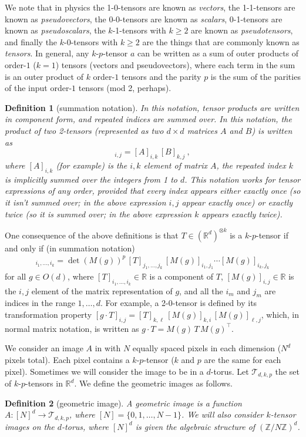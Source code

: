 \documentclass{article}
\theoremstyle{plain}
\newtheorem{definition}{Definition}
\begin{document}
We note that in physics the 1-0-tensors are known as \emph{vectors}, the 1-1-tensors are known as \emph{pseudovectors}, the 0-0-tensors are known as \emph{scalars}, 0-1-tensors are known as \emph{pseudoscalars}, the $k$-1-tensors with $k\geq 2$ are known as \emph{pseudotensors}, and finally the $k$-0-tensors with $k\geq 2$ are the things that are commonly known as \emph{tensors}.
In general, any $k$-$p$-tensor $a$ can be written as a sum of outer products of order-$1$ ($k=1$) tensors (vectors and pseudovectors), where each term in the sum is an outer product of $k$ order-$1$ tensors and the parity $p$ is the sum of the parities of the input order-$1$ tensors (mod 2, perhaps).

\begin{definition}[summation notation]
In this notation, tensor products are written in component form, and repeated indices are summed over.
In this notation, the product of two 2-tensors (represented as two $d\times d$ matrices $A$ and $B$) is written as
\begin{equation}
    [A\, B]_{i,j} = [A]_{i,k}\,[B]_{k,j} ~,
\end{equation}
where $[A]_{i,k}$ (for example) is the $i,k$ element of matrix $A$, the repeated index $k$ is implicitly summed over the integers from 1 to $d$.
This notation works for tensor expressions of any order, provided that every index appears either exactly once (so it isn't summed over; in the above expression $i, j$ appear exactly once) or exactly twice (so it is summed over; in the above expression $k$ appears exactly twice). 
\end{definition}

One consequence of the above definitions is that 
$T\in (\mathbb R^d)^{\otimes k}$ is a $k$-$p$-tensor if and only if (in summation notation)
\begin{align}
    [g\cdot T]_{i_1,\ldots, i_k} = \det(M(g))^p\, [T]_{j_1,\ldots,j_k}\,[M(g)]_{i_1,j_1}\cdots[M(g)]_{i_k,j_k}
\end{align} for all $g\in O(d)$, where $[T]_{i_1, \ldots ,i_k} \in \mathbb R$ is a component of $T$, $[M(g)]_{i,j}\in\mathbb R$ is the $i,j$ element of the matrix representation of $g$, and all the $i_m$ and $j_m$ are indices in the range $1,\ldots,d$.
For example, a 2-0-tensor is defined by its transformation property
$[g\cdot T]_{i,j} = [T]_{k,\ell}\,[M(g)]_{k,i}\,[M(g)]_{\ell,j}$,
which, in normal matrix notation, is written as
$g\cdot T = M(g)\,T\,M(g)^\top$.

We consider an image $A$ in with $N$ equally spaced pixels in each dimension ($N^d$ pixels total). Each pixel contains a $k$-$p$-tensor ($k$ and $p$ are the same for each pixel). Sometimes we will consider the image to be in a $d$-torus. 
Let $\mathcal T_{d,k,p}$ the set of $k$-$p$-tensors in $\mathbb R^d$. We define the geometric images as follows.
\begin{definition}[geometric image]
A geometric image is a function $A:[N]^d \to \mathcal T_{d,k,p}$, where $[N]=\{0,1,\ldots, N-1\}$. We will also consider $k$-tensor images on the $d$-torus, where $[N]^d$ is given the algebraic structure of $(\mathbb Z / N\mathbb Z)^d$.
\end{definition}
\end{document}
